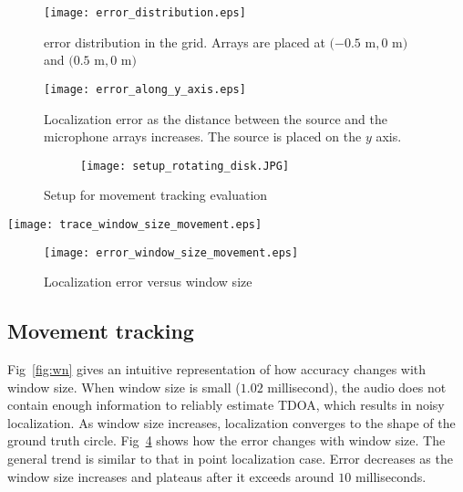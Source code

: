 \begin{figure}[]
\centering
\texttt{[image: error\_distribution.eps]}
\caption{error distribution in the grid. Arrays are placed at $(-0.5$ m$, 0$ m$)$ and $(0.5$ m$, 0$ m$)$}
\label{fig:error_distribution}
\end{figure}

\begin{figure}[]
\centering
\texttt{[image: error\_along\_y\_axis.eps]}
\caption{Localization error as the distance between the source and the microphone arrays increases. The source is placed on the $y$ axis.}
\label{fig:error_along_y}
\end{figure}


\begin{figure}[]
  \centering
  \begin{subfigure}[]{1.0\textwidth}
    \texttt{[image: setup\_rotating\_disk.JPG]}
  \end{subfigure}
  \caption{Setup for movement tracking evaluation}
  \label{fig:setup_circle}
\end{figure}


\begin{figure*}[]
\centering
  \texttt{[image: trace\_window\_size\_movement.eps]}
\caption{Localization quality versus window size}\label{fig:wn}
\label{fig:trace_win_circle}
\end{figure*}

\begin{figure}[]
\centering
\texttt{[image: error\_window\_size\_movement.eps]}
\caption{Localization error versus window size}
\label{fig:err_win_circle}
\end{figure}


\subsection{Movement tracking}

Fig~\ref{fig:wn} gives an intuitive representation of how accuracy changes with window size. When window size is small ($1.02$ millisecond), the audio does not contain enough information to reliably estimate TDOA, which results in noisy localization. As window size increases, localization converges to the shape of the ground truth circle. Fig~\ref{fig:err_win_circle} shows how the error changes with window size. The general trend is similar to that in point localization case. Error decreases as the window size increases and plateaus after it exceeds around $10$ milliseconds.

